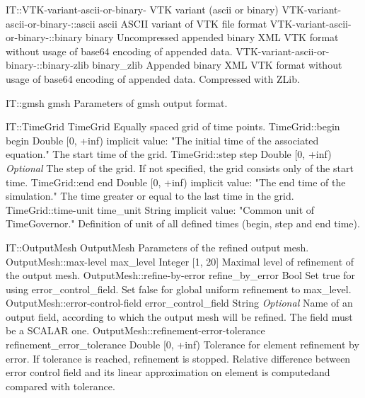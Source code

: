 \begin{SelectionType}
	{IT::VTK-variant-ascii-or-binary-}
	{VTK variant (ascii or binary)}
	{}
		\SelectionItem
			{VTK-variant-ascii-or-binary-::ascii}
			{ascii}
			{{{ASCII variant of VTK file format}%
}}
		\SelectionItem
			{VTK-variant-ascii-or-binary-::binary}
			{binary}
			{{{Uncompressed appended binary XML VTK format without usage of base64 encoding of appended data.}%
}}
		\SelectionItem
			{VTK-variant-ascii-or-binary-::binary-zlib}
			{binary{\_}zlib}
			{{{Appended binary XML VTK format without usage of base64 encoding of appended data.
Compressed with ZLib.}%
}}
\end{SelectionType}
\begin{RecordType}
	{IT::gmsh}
	{gmsh}
	{}%
	{}%
	{{{Parameters of gmsh output format.}%
}}
\end{RecordType}
\begin{RecordType}
	{IT::TimeGrid}
	{TimeGrid}
	{}%
	{}%
	{{{Equally spaced grid of time points.}%
}}
		\RecKey
			{TimeGrid::begin}
			{begin}
			{{Double [0, +inf)}}{}
			{implicit value: "{The initial time of the associated equation.}"}
			{{{The start time of the grid.}%
}}
		\RecKey
			{TimeGrid::step}
			{step}
			{{Double [0, +inf)}}{}
			{ \it{Optional}}
			{{{The step of the grid.
If not specified, the grid consists only of the start time.}%
}}
		\RecKey
			{TimeGrid::end}
			{end}
			{{Double [0, +inf)}}{}
			{implicit value: "{The end time of the simulation.}"}
			{{{The time greater or equal to the last time in the grid.}%
}}
		\RecKey
			{TimeGrid::time-unit}
			{time{\_}unit}
			{{String}}{}
			{implicit value: "{Common unit of TimeGovernor.}"}
			{{{Definition of unit of all defined times (begin, step and end time).}%
}}
\end{RecordType}
\begin{RecordType}
	{IT::OutputMesh}
	{OutputMesh}
	{}%
	{}%
	{{{Parameters of the refined output mesh.}%
}}
		\RecKey
			{OutputMesh::max-level}
			{max{\_}level}
			{{Integer [1, 20]}}{}
			{ }
			{{{Maximal level of refinement of the output mesh.}%
}}
		\RecKey
			{OutputMesh::refine-by-error}
			{refine{\_}by{\_}error}
			{{Bool}}{}
			{ }
			{{{Set true for using error{\_}control{\_}field.
Set false for global uniform refinement to max{\_}level.}%
}}
		\RecKey
			{OutputMesh::error-control-field}
			{error{\_}control{\_}field}
			{{String}}{}
			{ \it{Optional}}
			{{{Name of an output field, according to which the output mesh will be refined.
The field must be a SCALAR one.}%
}}
		\RecKey
			{OutputMesh::refinement-error-tolerance}
			{refinement{\_}error{\_}tolerance}
			{{Double [0, +inf)}}{}
			{ }
			{{{Tolerance for element refinement by error.
If tolerance is reached, refinement is stopped.
Relative difference between error control field and its linear approximation on element is computedand compared with tolerance.}%
}}
\end{RecordType}

